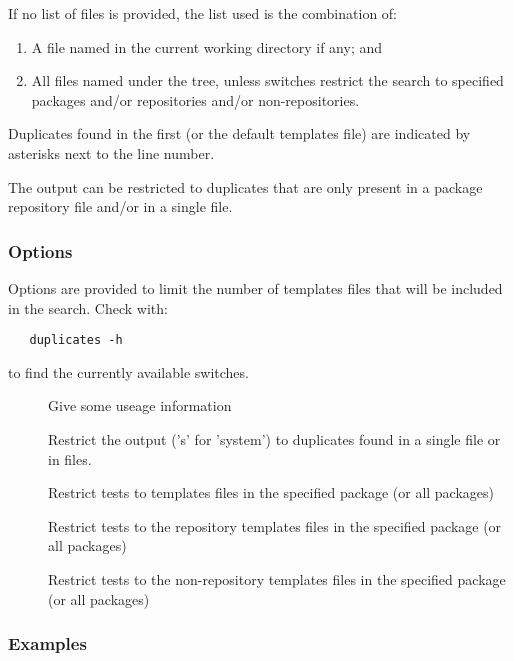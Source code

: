 If no list of files is provided, the list used is the combination of:
\begin{enumerate}
        \item A file named  in the current working directory
              if any; and
        \item All files named  under the
              tree, unless switches restrict the search to
              specified packages and/or repositories and/or non-repositories.
\end{enumerate}

Duplicates found in the first (or the default templates file) are indicated
by asterisks next to the line number.

The output can be restricted to duplicates that are only present in a package
repository file and/or in a single file.

\subsubsection*{Options}

Options are provided to limit the number of templates files that will be
included in the search. Check with:

\begin{verbatim}
   duplicates -h
\end{verbatim}

to find the currently available switches.

\begin{description}
\item[]
    Give some useage information
\item[]
    Restrict the output ('s' for 'system') to duplicates found in a single
    file or in  files.
\item[]
    Restrict tests to templates files in the specified package (or all
    packages)
\item[]
    Restrict tests to the repository templates files in the specified package
    (or all packages)
\item[]
    Restrict tests to the non-repository templates files in the specified package
    (or all packages)
\end{description}

\subsubsection*{Examples}

